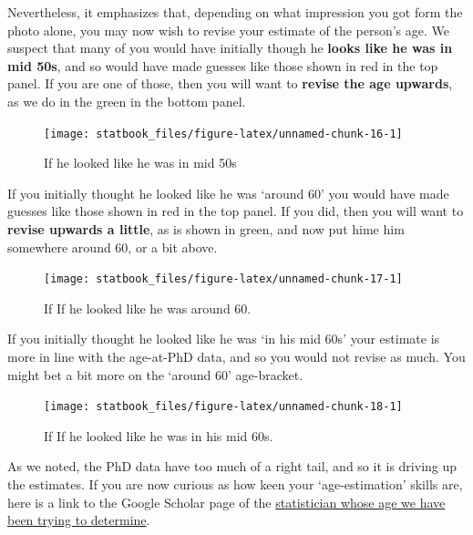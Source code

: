 \documentclass[]{book}
\begin{document}
Nevertheless, it emphasizes that, depending on what impression you got form the photo alone, you may now wish to revise your estimate of the person's age. We suspect that many of you would have initially though he \textbf{looks like he was in mid 50s}, and so would have made guesses like those shown in red in the top panel. If you are one of those, then you will want to \textbf{revise the age upwards}, as we do in the green in the bottom panel.

\begin{figure}

{\centering \texttt{[image: statbook\_files/figure-latex/unnamed-chunk-16-1]} 

}

\caption{If he looked like he was in mid 50s}\label{fig:unnamed-chunk-16}
\end{figure}

If you initially thought he looked like he was `around 60' you would have made guesses like those shown in red in the top panel. If you did, then you will want to \textbf{revise upwards a little}, as is shown in green, and now put hime him somewhere around 60, or a bit above.

\begin{figure}

{\centering \texttt{[image: statbook\_files/figure-latex/unnamed-chunk-17-1]} 

}

\caption{If If he looked like he was around 60.}\label{fig:unnamed-chunk-17}
\end{figure}

If you initially thought he looked like he was `in his mid 60s' your estimate is more in line with the age-at-PhD data, and so you would not revise as much. You might bet a bit more on the `around 60' age-bracket.

\begin{figure}

{\centering \texttt{[image: statbook\_files/figure-latex/unnamed-chunk-18-1]} 

}

\caption{If If he looked like he was in his mid 60s.}\label{fig:unnamed-chunk-18}
\end{figure}

As we noted, the PhD data have too much of a right tail, and so it is driving up the estimates. If you are now curious as how keen your `age-estimation' skills are, here is a link to the Google Scholar page of the \href{https://scholar.google.com/citations?user=e8DARmEAAAAJ\&hl=en}{statistician whose age we have been trying to determine}.
\end{document}
